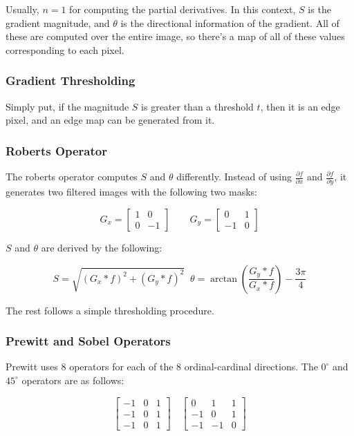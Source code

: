 \documentclass{article}
\begin{document}
\begin{multicols}{3}
Usually, $n=1$ for computing the partial derivatives. In this context, $S$ is the gradient magnitude, and $\theta$ is the directional information of the gradient. All of these are computed over the entire image, so there's a map of all of these values corresponding to each pixel.

\subsubsection{Gradient Thresholding}

Simply put, if the magnitude $S$ is greater than a threshold $t$, then it is an edge pixel, and an edge map can be generated from it.

\subsubsection{Roberts Operator}

The roberts operator computes $S$ and $\theta$ differently. Instead of using $\frac{\partial f}{\partial x}$ and $\frac{\partial f}{\partial y}$, it generates two filtered images with the following two masks:

$$
G_x = \left[\begin{matrix}1 & 0\\ 0 & -1\end{matrix}\right] \quad\quad G_y = \left[\begin{matrix}0 & 1\\ -1 & 0\end{matrix}\right]
$$

$S$ and $\theta$ are derived by the following:

$$
S = \sqrt{\left(G_x * f\right)^2 + \left(G_y * f\right)^2} \;\; \theta = \arctan\left(\frac{G_y * f}{G_x * f}\right) - \frac{3\pi}{4}
$$

The rest follows a simple thresholding procedure.

\subsubsection{Prewitt and Sobel Operators}

Prewitt uses 8 operators for each of the 8 ordinal-cardinal directions. The $0^{\circ}$ and $45^{\circ}$ operators are as follows:

$$
\begin{bmatrix}
  -1 & 0 & 1\\
  -1 & 0 & 1\\
  -1 & 0 & 1
\end{bmatrix}\quad
\begin{bmatrix}
  0 & 1 & 1\\
  -1 & 0 & 1\\
  -1 & -1 & 0
\end{bmatrix}
$$


\end{multicols}
\end{document}
